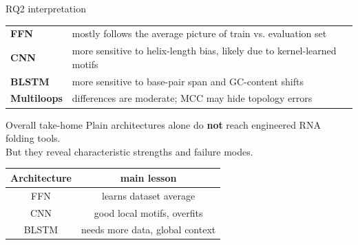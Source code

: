 \documentclass{beamer}
\newif\ifshowchapterbar
\begin{document}
\begin{frame}{RQ2 interpretation}
  \vfill
  \begin{tabularx}{\textwidth}{@{}>{\bfseries}l X@{}}
    FFN        & mostly follows the average picture of train vs. evaluation set           \\[0.9em]
    CNN        & more sensitive to helix-length bias, likely due to kernel-learned motifs \\[0.9em]
    BLSTM      & more sensitive to base-pair span and GC-content shifts                   \\[0.9em]
    Multiloops & differences are moderate; MCC may hide topology errors                   \\
  \end{tabularx}
  \vfill
\end{frame}

\showchapterbarfalse
\begin{frame}{Overall take-home}
  \vfill
  \Large
  Plain architectures alone do \textbf{not} reach engineered RNA folding tools.\\[0.9em]
  But they reveal characteristic strengths and failure modes.\\[1.1em]
  \begin{center}
    \begin{tabular}{c|c}
      \textbf{Architecture} & \textbf{main lesson}            \\
      \hline
      FFN                   & learns dataset average          \\
      CNN                   & good local motifs, overfits     \\
      BLSTM                 & needs more data, global context \\
    \end{tabular}
  \end{center}
  \vfill
\end{frame}
\end{document}
